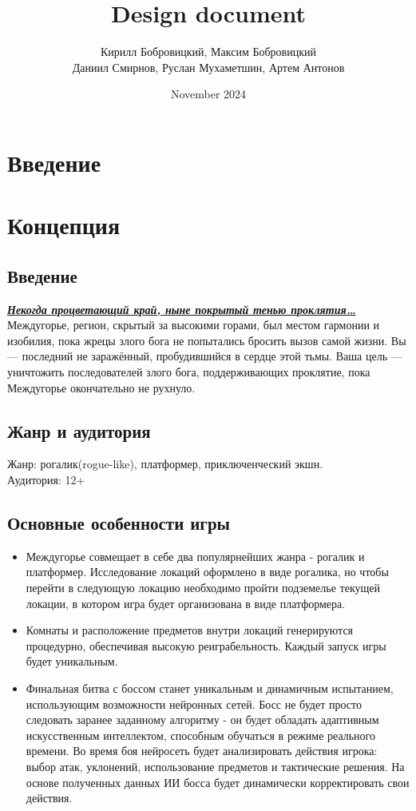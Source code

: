 \documentclass{article}
\title{Design document}
\author{Кирилл Бобровицкий, Максим Бобровицкий\\
Даниил Смирнов, Руслан Мухаметшин, Артем Антонов}
\date{November 2024}
\begin{document}
\maketitle

\tableofcontents
\newpage

\section{Введение}


\newpage

\section{Концепция}
\subsection{Введение}
\noindent\textit{\textbf{\underline{Некогда процветающий край, ныне покрытый тенью проклятия…}}}
Междугорье, регион, скрытый за высокими горами, был местом гармонии и изобилия, пока жрецы злого бога не попытались бросить вызов самой жизни.  
Вы — последний не заражённый, пробудившийся в сердце этой тьмы. Ваша цель — уничтожить последователей злого бога, поддерживающих проклятие, пока Междугорье окончательно не рухнуло.

\subsection{Жанр и аудитория}
Жанр: рогалик(rogue-like), платформер, приключенческий экшн.\\  
Аудитория: 12+

\subsection{Основные особенности игры}
\begin{itemize}
\item Междугорье совмещает в себе два популярнейших жанра - рогалик и  платформер. Исследование локаций оформлено в виде рогалика, но чтобы перейти в следующую локацию необходимо пройти подземелье текущей локации, в котором игра будет организована в виде платформера. 

\item Комнаты и расположение предметов внутри локаций генерируются процедурно, обеспечивая высокую реиграбельность. Каждый запуск игры будет уникальным. 

\item Финальная битва с боссом станет уникальным и динамичным испытанием, использующим возможности нейронных сетей. Босс не будет просто следовать заранее заданному алгоритму - он будет обладать адаптивным искусственным интеллектом, способным обучаться в режиме реального времени. Во время боя нейросеть будет анализировать действия игрока: выбор атак, уклонений, использование предметов и тактические решения. На основе полученных данных ИИ босса будет динамически корректировать свои действия.
\end{itemize}
\end{document}
